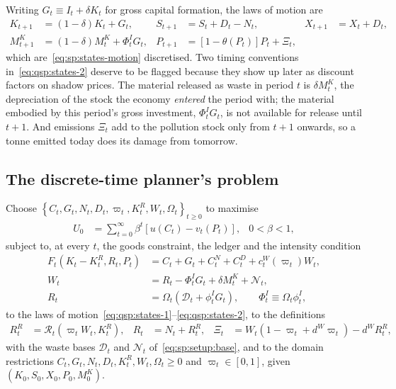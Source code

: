 Writing $G_t\equiv I_t+\delta K_t$ for gross capital formation, the laws of motion are
\begin{align}
K_{t+1} &= \left(1-\delta\right)K_t+G_t,
&
S_{t+1} &= S_t+D_t-N_t,
&
X_{t+1} &= X_t+D_t,
\label{eq:qsp:states-1}
\\
M^K_{t+1} &= \left(1-\delta\right)M^K_t+\Phi^I_tG_t,
&
P_{t+1} &= \left[1-\theta\!\left(P_t\right)\right]P_t+\Xi_t,
&&
\label{eq:qsp:states-2}
\end{align}
which are~\eqref{eq:sp:states-motion} discretised. Two timing conventions in~\eqref{eq:qsp:states-2}
deserve to be flagged because they show up later as discount factors on shadow prices. The material
released as waste in period $t$ is $\delta M^K_t$, the depreciation of the stock the economy
\emph{entered} the period with; the material embodied by this period's gross investment, $\Phi^I_tG_t$,
is not available for release until $t+1$. And emissions $\Xi_t$ add to the pollution stock only from
$t+1$ onwards, so a tonne emitted today does its damage from tomorrow.

\subsection{The discrete-time planner's problem}\label{sec:qsp:setup:problem}

\begin{problem}\label{prob:qsp}
Choose $\left\{C_t,G_t,N_t,D_t,\varpi_t,K^R_t,W_t,\Omega_t\right\}_{t\ge0}$ to maximise
\begin{align}
U_0 &= \sum_{t=0}^{\infty}\beta^t\left[u\!\left(C_t\right)-v_t\!\left(P_t\right)\right],
&
0<\beta<1,
\label{eq:qsp:objective}
\end{align}
subject to, at every $t$, the goods constraint, the ledger and the intensity condition
\begin{align}
F_t\!\left(K_t-K^R_t,R_t,P_t\right) &= C_t+G_t+C^N_t+C^D_t+c^W_t\!\left(\varpi_t\right)W_t,
\label{eq:qsp:goods}
\\
W_t &= R_t-\Phi^I_tG_t+\delta M^K_t+\mathcal N_t,
\label{eq:qsp:ledger}
\\
R_t &= \Omega_t\left(\mathcal D_t+\phi^I_tG_t\right),
\qquad \Phi^I_t\equiv\Omega_t\phi^I_t,
\label{eq:qsp:intensity}
\end{align}
to the laws of motion~\eqref{eq:qsp:states-1}--\eqref{eq:qsp:states-2}, to the definitions
\begin{align}
R^R_t &= \mathcal R_t\!\left(\varpi_tW_t,K^R_t\right),
&
R_t &= N_t+R^R_t,
&
\Xi_t &= W_t\left(1-\varpi_t+d^W\varpi_t\right)-d^WR^R_t,
\label{eq:qsp:definitions}
\end{align}
with the waste bases $\mathcal D_t$ and $\mathcal N_t$ of~\eqref{eq:sp:setup:base}, and to the domain
restrictions $C_t,G_t,N_t,D_t,K^R_t,W_t,\Omega_t\ge0$ and $\varpi_t\in\left[0,1\right]$, given
$\left(K_0,S_0,X_0,P_0,M^K_0\right)$.
\end{problem}

